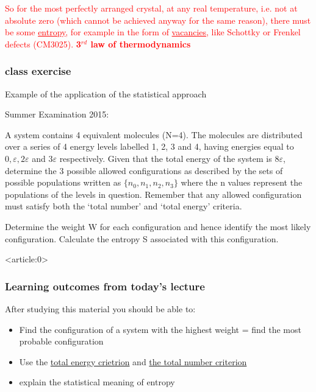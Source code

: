 \documentclass[a4paper,12pt,titlepage]{article}
\begin{document}
\textcolor{red}{So for the most perfectly arranged crystal, at any real temperature, i.e. not at absolute zero (which cannot be achieved anyway for the same reason), there must be some \underline{entropy}, for example in the form of \underline{vacancies}, like Schottky or Frenkel defects (CM3025). \textbf{3\(^{rd}\) law of thermodynamics}}


\begin{frame}
\frametitle{class exercise}
Example of the application of the statistical approach

Summer Examination 2015:

A system contains 4 equivalent molecules (N=4). The molecules are distributed over a series of 4 energy levels labelled 1, 2, 3 and 4, having energies equal to \( 0, \varepsilon, 2\varepsilon\) and \(3\varepsilon\) respectively. Given that the total energy of the system is \(8\varepsilon\), determine the 3 possible allowed configurations as described by the sets of possible populations written as \(\{n_0, n_1, n_2, n_3\}\) where the n values represent the populations of the levels in question. Remember that any allowed configuration must satisfy both the ‘total number’ and ‘total energy’  criteria.

Determine the weight W for each configuration and hence identify the most likely configuration.  Calculate the entropy  S associated with this configuration.	
\end{frame}

\begin{frame}<article:0>
\frametitle{Learning outcomes from today's lecture}
After studying this material you should be able to:
\begin{itemize}
\item Find the configuration of a system with the highest weight = find the most probable configuration
\item Use the \underline{total energy crietrion} and \underline{the total number criterion}
\item explain the statistical meaning of entropy
\end{itemize}
\end{frame}

\end{document}
